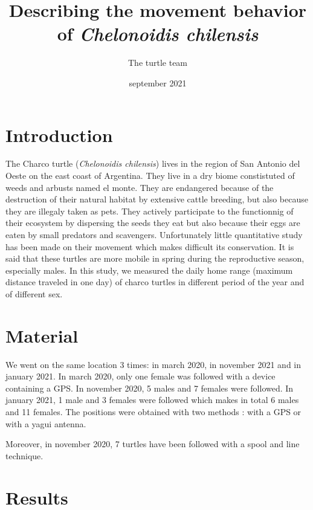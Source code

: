 \documentclass[10pt]{article}
\begin{document}
\title{Describing the movement behavior of \textit{Chelonoidis chilensis}}
\author{The turtle team}

\date{september 2021}
\maketitle

\section*{Introduction}

The Charco turtle (\textit{Chelonoidis chilensis}) lives in the region of San Antonio del Oeste on the east coast of Argentina. They live in a dry biome constistuted of weeds and arbusts named el monte. They are endangered because of the destruction of their natural habitat by extensive cattle breeding, but also because they are illegaly taken as pets. They actively participate to the functionnig of their ecosystem by dispersing the seeds they eat but also because their eggs are eaten by small predators and scavengers. Unfortunately little quantitative study has been made on their movement which makes difficult its conservation. It is said that these turtles are more mobile in spring during the reproductive season, especially males. In this study, we measured the daily home range (maximum distance traveled in one day) of charco turtles in different period of the year and of different sex. 

\section*{Material}

We went on the same location 3 times: in march 2020, in november 2021 and in january 2021. In march 2020, only one female was followed with a device containing a GPS. In november 2020, 5 males and 7 females were followed. In january 2021, 1 male and 3 females were followed which makes in total 6 males and 11 females. The positions were obtained with two methods : with a GPS or with a yagui antenna.

Moreover, in november 2020, 7 turtles have been followed with a spool and line technique.

\section*{Results}
\end{document}
